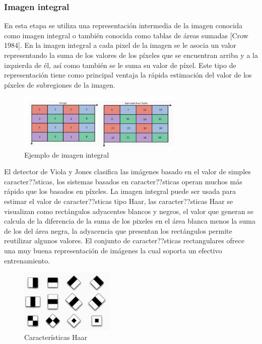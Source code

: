    \subsubsection{Imagen integral}
   En esta etapa se utiliza una representación intermedia de la imagen conocida como imagen integral o también conocida como tablas de áreas sumadas [Crow 1984]. En la imagen integral a cada pixel de la imagen se le asocia un valor representando la suma de los valores de los píxeles que se encuentran arriba y a la izquierda de él, así como también se le suma su valor de píxel. Este tipo de representación tiene como principal ventaja la rápida estimación del valor de los píxeles de subregiones de la imagen.
   \begin{figure}[htbp]
   	\centering
   	\includegraphics[width=0.7\textwidth]{./pictures/imagenIntegral}
   	\caption{Ejemplo de imagen integral}\label{fig: figura}
   \end{figure}
   El detector de Viola y Jones clasifica las imágenes basado en el valor de simples caracter??sticas, los sistemas basados en caracter??sticas operan muchos más rápido que los basados en píxeles. La imagen integral puede ser usada para estimar el valor de caracter??sticas tipo Haar, las caracter??sticas Haar se visualizan como rectángulos adyacentes blancos y negros, el valor que generan se calcula de la diferencia de la suma de los pixeles en el área blanca menos la suma de los del área negra, la adyacencia que presentan los rectángulos permite reutilizar algunos valores. El conjunto de caracter??sticas rectangulares ofrece una muy buena representación de imágenes la cual soporta un efectivo entrenamiento.
   
   \begin{figure}[htbp]
   	\centering
   	\includegraphics[width=0.4\textwidth]{./pictures/haar}
   	\caption{Características Haar}\label{fig: figura}
   \end{figure}
   
